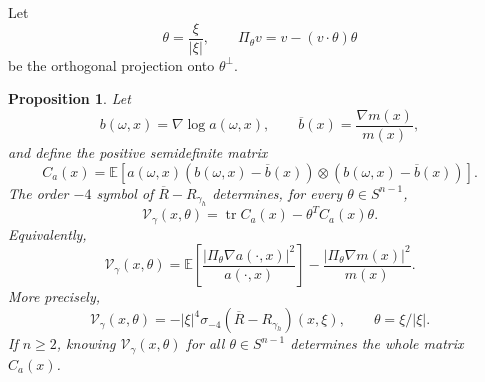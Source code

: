 \documentclass[11pt]{article}
\newcommand{\E}{\mathbb E}
\newcommand{\tr}{\operatorname{tr}}
\theoremstyle{plain}
\newtheorem{proposition}[theorem]{Proposition}
\theoremstyle{definition}
\theoremstyle{remark}
\begin{document}
Let
\[
  \theta=\frac{\xi}{|\xi|},
  \qquad
  \Pi_\theta v=v-(v\cdot\theta)\theta
\]
be the orthogonal projection onto $\theta^\perp$.

\begin{proposition}\label{prop:conductivity-first-invariant}
Let
\[
  b(\omega,x)=\nabla\log a(\omega,x),
  \qquad
  \overline b(x)=\frac{\nabla m(x)}{m(x)},
\]
and define the positive semidefinite matrix
\begin{equation}\label{eq:conductivity-covariance-matrix}
  C_a(x)=\E\left[a(\omega,x)
  (b(\omega,x)-\overline b(x))\otimes
  (b(\omega,x)-\overline b(x))\right].
\end{equation}
The order $-4$ symbol of $\overline R-R_{\gamma_h}$ determines, for every $\theta\in S^{n-1}$,
\begin{equation}\label{eq:conductivity-invariant}
  \mathcal V_\gamma(x,\theta)
  =\tr C_a(x)-\theta^TC_a(x)\theta.
\end{equation}
Equivalently,
\[
  \mathcal V_\gamma(x,\theta)
  =\E\left[\frac{|\Pi_\theta\nabla a(\cdot,x)|^2}{a(\cdot,x)}\right]
  -\frac{|\Pi_\theta\nabla m(x)|^2}{m(x)}.
\]
More precisely,
\[
  \mathcal V_\gamma(x,\theta)
  =- |\xi|^4\sigma_{-4}(\overline R-R_{\gamma_h})(x,\xi),
  \qquad \theta=\xi/|\xi|.
\]
If $n\ge2$, knowing $\mathcal V_\gamma(x,\theta)$ for all $\theta\in S^{n-1}$ determines the whole matrix $C_a(x)$.
\end{proposition}
\end{document}
